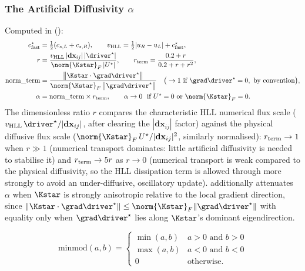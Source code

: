 \subsubsection{The Artificial Diffusivity $\alpha$}
Computed in 
():
\begin{align}
  c_{\rm fast}^\star &= \tfrac12(c_{s,L}+c_{s,R}) , \qquad
  v_{\rm HLL} = \tfrac12|u_R-u_L| + c_{\rm fast}^\star , \\
  r &= \frac{v_{\rm HLL}\, |\mathbf{dx}_{ij}|\, |\driver^\star|}{\norm{\Kstar}_F \, |U^\star|} ,
  \qquad
  r_{\rm term} = \frac{0.2+r}{0.2+r+r^2} , \\
  \mathrm{norm\_term} &=
    \frac{\big\| \Kstar \cdot \grad\driver^\star \big\|}{\norm{\Kstar}_F\,\big\|\grad\driver^\star\big\|}
    \quad\big(\to 1 \text{ if } \grad\driver^\star = 0,\ \text{by convention}\big), \\
  \alpha &= \mathrm{norm\_term}\times r_{\rm term} ,
  \qquad \alpha \to 0 \ \text{ if } U^\star = 0 \text{ or } \norm{\Kstar}_F = 0 .
  \label{eq:alpha_def}
\end{align}
The dimensionless ratio $r$ compares the characteristic HLL numerical
flux scale ($v_{\rm HLL}\,\driver^\star/|\mathbf{dx}_{ij}|$, after
clearing the $|\mathbf{dx}_{ij}|$ factor) against the physical diffusive
flux scale ($\norm{\Kstar}_F\,U^\star/|\mathbf{dx}_{ij}|^2$, similarly
normalised): $r_{\rm term}\to 1$ when $r\gg1$ (numerical transport
dominates: little artificial diffusivity is needed to stabilise it) and
$r_{\rm term}\to 5r$ as $r\to0$ (numerical transport is weak compared to
the physical diffusivity, so the HLL dissipation term is allowed through
more strongly to avoid an under-diffusive, oscillatory update).
 additionally attenuates $\alpha$ when $\Kstar$ is
strongly anisotropic relative to the local gradient direction, since
$\|\Kstar\cdot\grad\driver^\star\| \leq \norm{\Kstar}_F
\|\grad\driver^\star\|$ with equality only when $\grad\driver^\star$ lies
along $\Kstar$'s dominant eigendirection.

\begin{definition}
\label{eq:minmod_def}
\begin{equation}
  \mathrm{minmod}(a,b) =
  \begin{cases}
    \min(a,b) & a>0 \text{ and } b>0 \\
    \max(a,b) & a<0 \text{ and } b<0 \\
    0 & \text{otherwise.}
  \end{cases}
\end{equation}
\end{definition}

